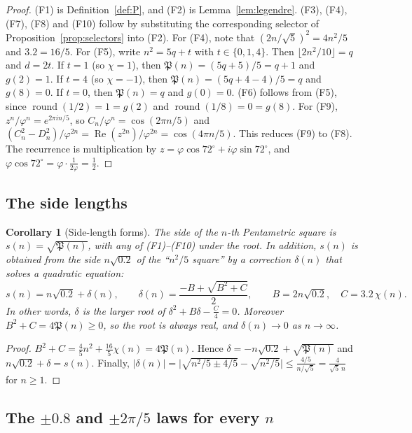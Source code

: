 \documentclass[11pt,a4paper]{article}
\newcommand{\Pent}{\mathfrak{P}}                      %
\theoremstyle{plain}
\newtheorem{corollary}[theorem]{Corollary}
\theoremstyle{definition}
\theoremstyle{remark}
\begin{document}
\begin{proof}
(F1) is Definition~\ref{def:P}, and (F2) is Lemma~\ref{lem:legendre}. (F3), (F4), (F7), (F8) and (F10) follow by substituting the corresponding selector of Proposition~\ref{prop:selectors} into (F2). For (F4), note that $(2n/\sqrt5)^{2}=4n^{2}/5$ and $3.2=16/5$.
For (F5), write $n^{2}=5q+t$ with $t\in\{0,1,4\}$. Then $\lfloor 2n^{2}/10\rfloor=q$ and $d=2t$. If $t=1$ (so $\chi=1$), then $\Pent(n)=(5q+5)/5=q+1$ and $g(2)=1$. If $t=4$ (so $\chi=-1$), then $\Pent(n)=(5q+4-4)/5=q$ and $g(8)=0$. If $t=0$, then $\Pent(n)=q$ and $g(0)=0$.
(F6) follows from (F5), since $\operatorname{round}(1/2)=1=g(2)$ and $\operatorname{round}(1/8)=0=g(8)$.
For (F9), $z^{n}/\varphi^{n}=e^{2\pi in/5}$, so $C_n/\varphi^{n}=\cos(2\pi n/5)$ and $(C_n^{2}-D_n^{2})/\varphi^{2n}=\operatorname{Re}(z^{2n})/\varphi^{2n}=\cos(4\pi n/5)$. This reduces (F9) to (F8). The recurrence is multiplication by $z=\varphi\cos72^\circ+i\varphi\sin72^\circ$, and $\varphi\cos72^\circ=\varphi\cdot\frac{1}{2\varphi}=\frac12$.
\end{proof}

\subsection{The side lengths}

\begin{corollary}[Side-length forms]\label{cor:side}
The side of the $n$-th Pentametric square is $s(n)=\sqrt{\Pent(n)}$, with any of (F1)–(F10) under the root. In addition, $s(n)$ is obtained from the side $n\sqrt{0.2}$ of the “$n^{2}/5$ square” by a correction $\delta(n)$ that solves a quadratic equation:
\[
  s(n)=n\sqrt{0.2}+\delta(n),\qquad \delta(n)=\frac{-B+\sqrt{B^{2}+C}}{2},\qquad B=2n\sqrt{0.2},\quad C=3.2\,\chi(n).
\]
In other words, $\delta$ is the larger root of $\delta^{2}+B\delta-\tfrac{C}{4}=0$. Moreover $B^{2}+C=4\Pent(n)\ge0$, so the root is always real, and $\delta(n)\to0$ as $n\to\infty$.
\end{corollary}

\begin{proof}
$B^{2}+C=\tfrac45n^{2}+\tfrac{16}{5}\chi(n)=4\Pent(n)$. Hence $\delta=-n\sqrt{0.2}+\sqrt{\Pent(n)}$ and $n\sqrt{0.2}+\delta=s(n)$. Finally, $|\delta(n)|=\bigl|\sqrt{n^{2}/5\pm4/5}-\sqrt{n^{2}/5}\bigr|\le\frac{4/5}{n/\sqrt5}=\frac{4}{\sqrt5\,n}$ for $n\ge1$.
\end{proof}

\subsection{The \texorpdfstring{$\pm0.8$}{±0.8} and \texorpdfstring{$\pm2\pi/5$}{±2π/5} laws for every \texorpdfstring{$n$}{n}}
\end{document}
